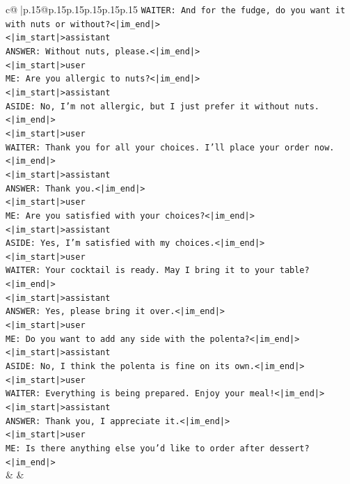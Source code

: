 \documentclass{article}
\begin{document}
{\begin{supertabular}{c@{$\;$}|p{.15\linewidth}@{}p{.15\linewidth}p{.15\linewidth}p{.15\linewidth}p{.15\linewidth}p{.15\linewidth}}
{{{\texttt{WAITER: And for the fudge, do you want it with nuts or without?<|im\_end|>} \\
\texttt{<|im\_start|>assistant} \\
\texttt{ANSWER: Without nuts, please.<|im\_end|>} \\
\texttt{<|im\_start|>user} \\
\texttt{ME: Are you allergic to nuts?<|im\_end|>} \\
\texttt{<|im\_start|>assistant} \\
\texttt{ASIDE: No, I'm not allergic, but I just prefer it without nuts.<|im\_end|>} \\
\texttt{<|im\_start|>user} \\
\texttt{WAITER: Thank you for all your choices. I'll place your order now.<|im\_end|>} \\
\texttt{<|im\_start|>assistant} \\
\texttt{ANSWER: Thank you.<|im\_end|>} \\
\texttt{<|im\_start|>user} \\
\texttt{ME: Are you satisfied with your choices?<|im\_end|>} \\
\texttt{<|im\_start|>assistant} \\
\texttt{ASIDE: Yes, I'm satisfied with my choices.<|im\_end|>} \\
\texttt{<|im\_start|>user} \\
\texttt{WAITER: Your cocktail is ready. May I bring it to your table?<|im\_end|>} \\
\texttt{<|im\_start|>assistant} \\
\texttt{ANSWER: Yes, please bring it over.<|im\_end|>} \\
\texttt{<|im\_start|>user} \\
\texttt{ME: Do you want to add any side with the polenta?<|im\_end|>} \\
\texttt{<|im\_start|>assistant} \\
\texttt{ASIDE: No, I think the polenta is fine on its own.<|im\_end|>} \\
\texttt{<|im\_start|>user} \\
\texttt{WAITER: Everything is being prepared. Enjoy your meal!<|im\_end|>} \\
\texttt{<|im\_start|>assistant} \\
\texttt{ANSWER: Thank you, I appreciate it.<|im\_end|>} \\
\texttt{<|im\_start|>user} \\
\texttt{ME: Is there anything else you'd like to order after dessert?<|im\_end|>} \\
            }
        }
    }
    & & \\ \\


\end{supertabular}}
\end{document}
